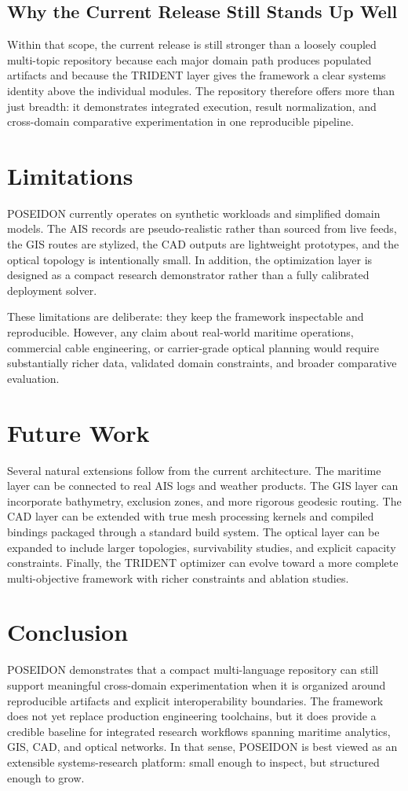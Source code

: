 \documentclass[conference]{IEEEtran}
\begin{document}
\subsection{Why the Current Release Still Stands Up Well}
Within that scope, the current release is still stronger than a loosely coupled
multi-topic repository because each major domain path produces populated
artifacts and because the TRIDENT layer gives the framework a clear systems
identity above the individual modules. The repository therefore offers more than
just breadth: it demonstrates integrated execution, result normalization, and
cross-domain comparative experimentation in one reproducible pipeline.

\section{Limitations}
POSEIDON currently operates on synthetic workloads and simplified domain models. The AIS records are pseudo-realistic rather than sourced from live feeds, the GIS routes are stylized, the CAD outputs are lightweight prototypes, and the optical topology is intentionally small. In addition, the optimization layer is designed as a compact research demonstrator rather than a fully calibrated deployment solver.

These limitations are deliberate: they keep the framework inspectable and reproducible. However, any claim about real-world maritime operations, commercial cable engineering, or carrier-grade optical planning would require substantially richer data, validated domain constraints, and broader comparative evaluation.

\section{Future Work}
Several natural extensions follow from the current architecture. The maritime layer can be connected to real AIS logs and weather products. The GIS layer can incorporate bathymetry, exclusion zones, and more rigorous geodesic routing. The CAD layer can be extended with true mesh processing kernels and compiled bindings packaged through a standard build system. The optical layer can be expanded to include larger topologies, survivability studies, and explicit capacity constraints. Finally, the TRIDENT optimizer can evolve toward a more complete multi-objective framework with richer constraints and ablation studies.

\section{Conclusion}
POSEIDON demonstrates that a compact multi-language repository can still support meaningful cross-domain experimentation when it is organized around reproducible artifacts and explicit interoperability boundaries. The framework does not yet replace production engineering toolchains, but it does provide a credible baseline for integrated research workflows spanning maritime analytics, GIS, CAD, and optical networks. In that sense, POSEIDON is best viewed as an extensible systems-research platform: small enough to inspect, but structured enough to grow.
\end{document}
